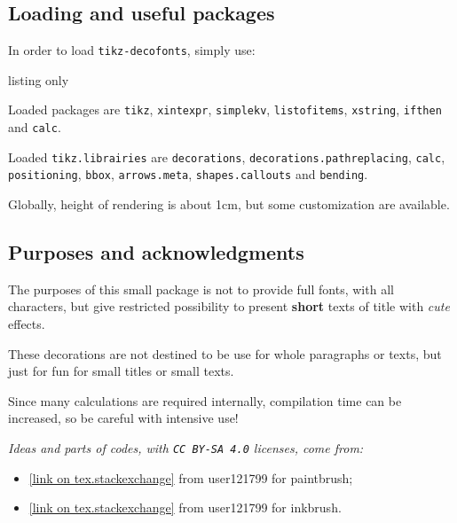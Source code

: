 \documentclass[11pt,a4paper]{ltxdoc}
\begin{document}
\subsection{Loading and useful packages}

In order to load \texttt{tikz-decofonts}, simply use:

\begin{DemoCode}{listing only}
\usepackage{tikz-decofonts}
\end{DemoCode}

Loaded packages are \texttt{tikz}, \texttt{xintexpr}, \texttt{simplekv}, \texttt{listofitems}, \texttt{xstring}, \texttt{ifthen} and \texttt{calc}.

Loaded \texttt{tikz.librairies} are \texttt{decorations}, \texttt{decorations.pathreplacing}, \texttt{calc}, \texttt{positioning}, \texttt{bbox}, \texttt{arrows.meta}, \texttt{shapes.callouts} and \texttt{bending}.

\smallskip

Globally, height of rendering is about 1cm, but some customization are available.

\subsection{Purposes and acknowledgments}

The purposes of this small package is not to provide full fonts, with all characters, but give restricted possibility to present \textbf{short} texts of title with \textit{cute} effects.

\smallskip

These decorations are not destined to be use for whole paragraphs or texts, but just for fun for small titles or small texts.

\smallskip

Since many calculations are required internally, compilation time can be increased, so be careful with intensive use!

\smallskip

\textit{Ideas and parts of codes, with \texttt{CC\,BY-SA\,4.0} licenses, come from:}

\begin{itemize}
	\item \href{https://tex.stackexchange.com/questions/475141/simulating-paintbrush-strokes-in-tikz}{[link on tex.stackexchange]} from \textsf{user121799} for paintbrush;
	\item \href{https://tex.stackexchange.com/questions/460836/custom-line-cap-to-simulate-inked-line-in-tikz/460842#460842}{[link on tex.stackexchange]} from \textsf{user121799} for inkbrush.
\end{itemize}
\end{document}
